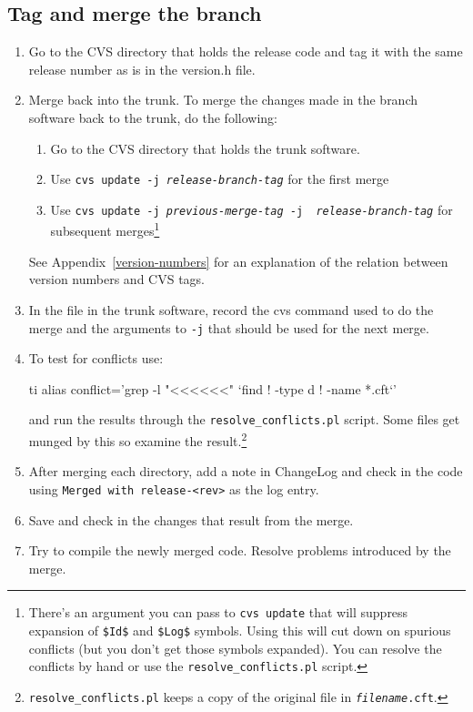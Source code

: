 \documentclass{dods-paper}
\begin{document}
\subsection{Tag and merge the branch}
\label{cvs-tag-merge}

\begin{enumerate}
\item Go to the CVS directory that holds the release code and tag it with the
  same release number as is in the version.h file.

\item Merge back into the trunk. To merge the changes made in the branch
  software back to the trunk, do the following: 
  \begin{enumerate}
  \item Go to the CVS directory that holds the trunk software.
  \item Use \texttt{cvs update -j {\em release-branch-tag}} for the first
    merge
  \item Use \texttt{cvs update -j {\em previous-merge-tag} -j {\em
      release-branch-tag}} for subsequent merges\footnote{There's an argument you
    can pass to \texttt{cvs update} that will suppress expansion of
    \texttt{\$Id\$} and \texttt{\$Log\$} symbols. Using this will cut down on
    spurious conflicts (but you don't get those symbols expanded). You can
    resolve the conflicts by hand or use the \texttt{resolve\_conflicts.pl}
    script.}
  \end{enumerate}
  See Appendix~\ref{version-numbers} for an explanation of the relation
  between version numbers and CVS tags.

\item In the  file in the trunk software, record the cvs command
  used to do the merge and the arguments to \texttt{-j} that should be used
  for the next merge.

\item To test for conflicts use: 

  \begin{vcode}{ti}
    alias conflict='grep -l "<<<<<<" `find ! -type d ! -name *.cft`'
  \end{vcode}

  and run the results through the
  \texttt{resolve\_conflicts.pl} script. Some files get munged by this so
  examine the result.\footnote{\texttt{resolve\_conflicts.pl} keeps a copy
    of the original file in \texttt{{\em filename}.cft}.}
  
\item After merging each directory, add a note in ChangeLog and check in the
  code using \texttt{Merged with \texttt{release-<rev>}} as the log entry.

\item Save and check in the changes that result from the merge.

\item Try to compile the newly merged code. Resolve problems introduced by
  the merge.
\end{enumerate}
\end{document}

